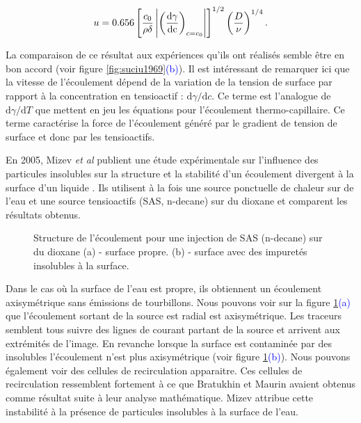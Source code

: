  \begin{equation}
    u=0.656\left[\dfrac{c_0 }{\rho \delta}\left| \left(\dfrac{\rm d \gamma}{\rm d c}\right)_{c=c_0}\right|\right]^{1/2}\left(\dfrac{D}{\nu}\right)^{1/4}.\label{eq:solRuck}
  \end{equation}
  
  La comparaison de ce résultat aux expériences qu'ils ont réalisés semble être en bon accord (voir figure \ref{fig:suciu1969}\textcolor{blue}{(b)}). Il est intéressant de remarquer ici que la vitesse de l'écoulement dépend de la variation de la tension de surface par rapport à la concentration en tensioactif : $\mathrm{d}\gamma/\mathrm{d}c$. Ce terme est l'analogue de $\mathrm{d}\gamma/\mathrm{d}T$ que mettent en jeu les équations pour l'écoulement thermo-capillaire. Ce terme caractérise la force de l'écoulement généré par le gradient de tension de surface et donc par les tensioactifs.
  
  
  
  En 2005, Mizev \textit{et al} publient une étude expérimentale sur l'influence des particules insolubles sur la structure et la stabilité d'un écoulement divergent à la surface d'un liquide \cite{Mizev2005}. Ils utilisent à la fois une source ponctuelle de chaleur sur de l'eau et une source tensioactifs (SAS, n-decane) sur du dioxane et comparent les résultats obtenus. 
  \begin{figure}[!ht]
    \centering
    
    \caption{Structure de l'écoulement pour une injection de SAS (n-decane) sur du dioxane (a) - surface propre. (b) - surface avec des impuretés insolubles à la surface. \cite{Mizev2005}}
    \label{fig:Mizev2005}
  \end{figure}
  Dans le cas où la surface de l'eau est propre, ils obtiennent un écoulement axisymétrique sans émissions de tourbillons. Nous pouvons voir sur la figure \ref{fig:Mizev2005}\textcolor{blue}{(a)} que l'écoulement sortant de la source est radial est axisymétrique. Les traceurs semblent tous suivre des lignes de courant partant de la source et arrivent aux extrémités de l'image.  En revanche lorsque la surface est contaminée par des insolubles l'écoulement n'est plus axisymétrique (voir figure \ref{fig:Mizev2005}\textcolor{blue}{(b)}). Nous pouvons également voir des cellules de recirculation apparaitre. Ces cellules de recirculation ressemblent fortement à ce que Bratukhin et Maurin avaient obtenus comme résultat suite à leur analyse mathématique. Mizev attribue cette instabilité à la présence de particules insolubles à la surface de l'eau.
  
